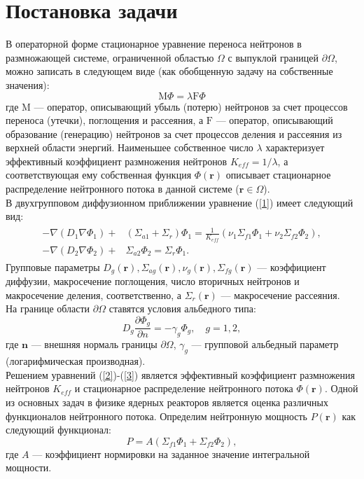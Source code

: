\section{Постановка задачи}
\label{s-1}
В операторной форме стационарное уравнение переноса нейтронов в размножающей системе, ограниченной областью $\Omega$ с выпуклой границей $\partial \Omega$, можно записать в следующем виде (как обобщенную задачу на собственные значения):
\begin{equation}\label{1}
\mathrm{M} \Phi = \lambda \mathrm{F} \Phi
\end{equation}
где $\mathrm{M}$ --- оператор, описывающий убыль (потерю) нейтронов за счет процессов переноса (утечки), поглощения и рассеяния, а $\mathrm{F}$ --- оператор, описывающий образование (генерацию) нейтронов за счет процессов деления и рассеяния из верхней области энергий. Наименьшее собственное число $\lambda$ характеризует эффективный коэффициент размножения нейтронов $K_{eff} = 1 / \lambda$, а соответствующая ему собственная функция $\Phi(\bm{r})$ описывает стационарное
распределение нейтронного потока в данной системе ($\bm{r} \in \Omega$).\\ 
В двухгрупповом диффузионном приближении уравнение (\ref{1}) имеет следующий вид:
\begin{align}\label{2}
\begin{split}
-\nabla(D_1 \nabla \Phi_1) + & (\Sigma_{a1} + \Sigma_r)\Phi_1 = \frac{1}{K_{eff}} (\nu_1 \Sigma_{f1} \Phi_1 + \nu_2 \Sigma_{f2} \Phi_2),
\\
-\nabla(D_2 \nabla \Phi_2) + & \Sigma_{a2} \Phi_2 = \Sigma_r \Phi_1.
\end{split}
\end{align}
Групповые параметры $D_g(\bm{r}), \Sigma_{ag}(\bm{r}), \nu_g(\bm{r}),    \Sigma_{fg}(\bm{r})$ --- коэффициент диффузии, макросечение поглощения, число вторичных нейтронов и макросечение деления, соответственно, а $\Sigma_r(\bm{r})$ --- макросечение рассеяния.\\
На границе области $\partial \Omega$ ставятся условия альбедного типа:
\begin{equation}\label{3}
D_g\frac{\partial \Phi_g}{\partial n} = - \gamma_g \Phi_g, \quad g = 1,2,
\end{equation}
где $\bm{n}$ --- внешняя нормаль границы $\partial \Omega$, $\gamma_g$ --- групповой альбедный параметр (логарифмическая производная).\\
Решением уравнений (\ref{2})-(\ref{3}) является эффективный коэффициент размножения нейтронов $K_{eff}$ и стационарное распределение нейтронного потока $\Phi(\bm{r})$. Одной из основных задач в физике ядерных реакторов является оценка различных функционалов нейтронного потока. Определим нейтронную мощность $P(\bm{r})$ как следующий функционал:
\begin{equation}\label{4}
P = A(\Sigma_{f1} \Phi_1 + \Sigma_{f2} \Phi_2),
\end{equation}
где $A$ --- коэффициент нормировки на заданное значение интегральной мощности.

